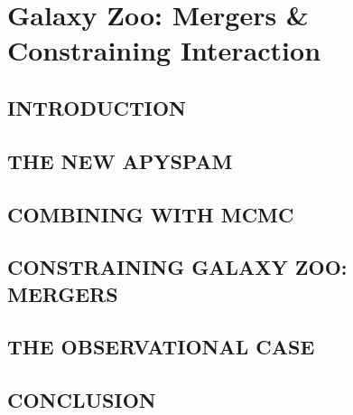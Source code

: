 \chapter{Galaxy Zoo: Mergers \& Constraining Interaction}
\section{INTRODUCTION}
\section{THE NEW APYSPAM}
\section{COMBINING WITH MCMC}
\section{CONSTRAINING GALAXY ZOO: MERGERS}
\section{THE OBSERVATIONAL CASE}
\section{CONCLUSION}